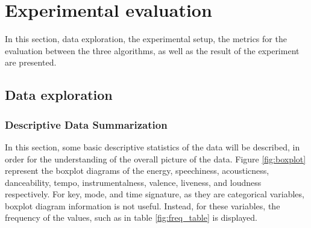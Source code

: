 \chapter{Experimental evaluation} %

\label{Chapter5} %

In this section, data exploration, the experimental setup, the metrics for the evaluation between the three algorithms, as well as the result of the experiment are presented.

\section{Data exploration}
\subsection{Descriptive Data Summarization}

In this section, some basic descriptive statistics of the data will be described, in order for the understanding of the overall picture of the data. Figure \ref{fig:boxplot} represent the boxplot diagrams of the energy, speechiness, acousticness, danceability, tempo, instrumentalness, valence, liveness, and loudness respectively. For key, mode, and time signature, as they are categorical variables, boxplot diagram information is not useful. Instead, for these variables, the frequency of the values, such as in table \ref{fig:freq_table} is displayed.

